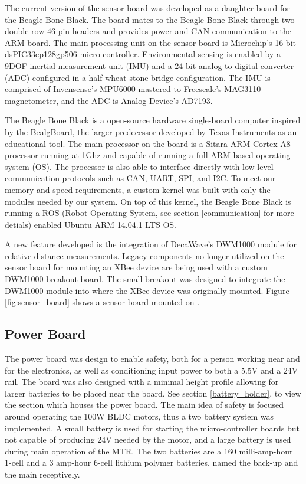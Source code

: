 The current version of the sensor board was developed as a daughter board for the Beagle Bone Black.
The board mates to the Beagle Bone Black through two double row 46 pin headers and provides power and CAN communication to the ARM board.
The main processing unit on the sensor board is Microchip's 16-bit dsPIC33ep128gp506 micro-controller.
Environmental sensing is enabled by a 9DOF inertial measurement unit (IMU) and a 24-bit analog to digital converter (ADC) configured in a half wheat-stone bridge configuration.
The IMU is comprised of Invensense's MPU6000 mastered to Freescale's MAG3110 magnetometer, and the ADC is Analog Device's AD7193.

The Beagle Bone Black is a open-source hardware single-board computer inspired by the BealgBoard, the larger predecessor developed by Texas Instruments as an educational tool.
The main processor on the board is a Sitara ARM Cortex-A8 processor running at 1Ghz and capable of running a full ARM based operating system (OS).
The processor is also able to interface directly with low level communication protocols such as CAN, UART, SPI, and I2C.
To meet our memory and speed requirements, a custom kernel was built with only the modules needed by our system.
On top of this kernel, the Beagle Bone Black is running a ROS (Robot Operating System, see section \ref{communication} for more detials) enabled Ubuntu ARM 14.04.1 LTS OS.

A new feature developed is the integration of DecaWave's DWM1000 module for relative distance measurements.
Legacy components no longer utilized on the sensor board for mounting an XBee device are being used with a custom DWM1000 breakout board.
The small breakout was designed to integrate the DWM1000 module into where the XBee device was originally mounted.
Figure \ref{fig:sensor_board} shows a sensor board mounted on \SB{}.

\subsection{Power Board}
\label{power_board}
The power board was design to enable safety, both for a person working near \SB{} and for the electronics, as well as conditioning input power to both a 5.5V and a 24V rail.
The board was also designed with a minimal height profile allowing for larger batteries to be placed near the board.
See section \ref{battery_holder}, to view the section which houses the power board.
The main idea of safety is focused around operating the 100W BLDC motors, thus a two battery system was implemented.
A small battery is used for starting the micro-controller boards but not capable of producing 24V needed by the motor, and a large battery is used during main operation of the MTR.
The two batteries are a 160 milli-amp-hour 1-cell and a 3 amp-hour 6-cell lithium polymer batteries, named the back-up and the main receptively.

